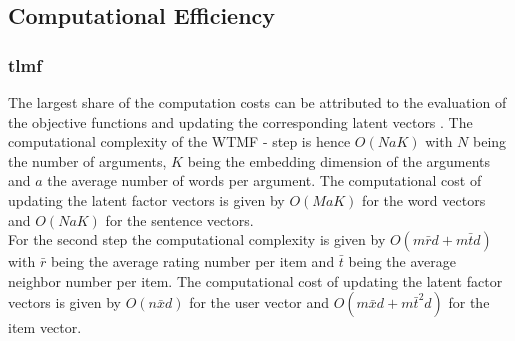 \subsection{Computational Efficiency}
\label{chap:efficiency}
\subsubsection{\acrshort{tlmf}}
The largest share of the computation costs can be attributed to the evaluation of the objective functions and updating the corresponding latent vectors \cite{li2016two}. 
The computational complexity of the WTMF - step is hence $O(N a K)$ with $N$ being the number of arguments, $K$ being the embedding dimension of the arguments and $a$ the average number of words per argument. The computational cost of updating the latent factor vectors is given by $O(M a K)$ for the word vectors and $O(N a K)$ for the sentence vectors.\\
For the second step the computational complexity is given by $O(m\bar{r}d + m\bar{t}d)$ with $\bar{r}$ being the average rating number per item and $\bar{t}$ being the average neighbor number per item. The computational cost of updating the latent factor vectors is given by $O(n\bar{x}d)$ for the user vector and $O(m\bar{x}d + m\bar{t}^{2}d)$ for the item vector.


